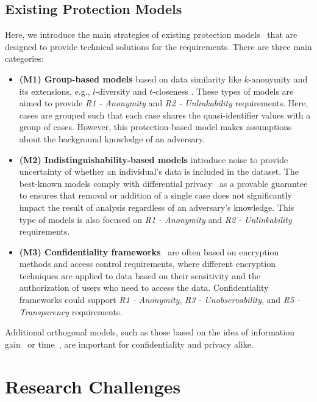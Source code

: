 \documentclass[manuscript]{acmart}
\begin{document}
\subsection{Existing Protection Models}

Here, we introduce the main strategies of existing protection models~\cite{wagner2018technical} that are designed to provide technical solutions for the requirements. There are three main categories:

\begin{itemize}
    \item \textbf{(M1) Group-based models} based on data similarity like $k$-anonymity \cite{sweeney2002k} and its extensions, e.g., $l$-diversity \cite{machanavajjhala2007diversity} and $t$-closeness \cite{li2007t}. 
    These types of models are aimed to provide \textit{R1 - Anonymity} and \textit{R2 - Unlinkability} requirements.
    Here, cases are grouped such that each case shares the quasi-identifier values with a group of cases. However, this protection-based model makes assumptions about the background knowledge of an adversary.  
    \item \textbf{(M2) Indistinguishability-based models} introduce noise to provide uncertainty of whether an individual's data is included in the dataset. The best-known models comply with differential privacy~\cite{dwork2008differential} as a provable guarantee to ensures that removal or addition of a single case does not significantly impact the result of analysis regardless of an adversary's knowledge. This type of models is also focused on \textit{R1 - Anonymity} and \textit{R2 - Unlinkability} requirements.
    \item \textbf{(M3) Confidentiality frameworks}~\cite{rafieiWA19_short} are often based on encryption methods and access control requirements, where different encryption techniques are applied to data based on their sensitivity and the authorization of users who need to access the data. Confidentiality frameworks could support \textit{R1 - Anonymity}, 
    \textit{R3 - Unobservability}, and \textit{R5 - Transparency} requirements. 
\end{itemize}

Additional orthogonal models, such as those based on the idea of information gain~\cite{kenthapadi2005simulatable} or time~\cite{wright2002analysis}, are important for confidentiality and privacy alike.

\section{Research Challenges}
\label{sec-discussion}
\end{document}
